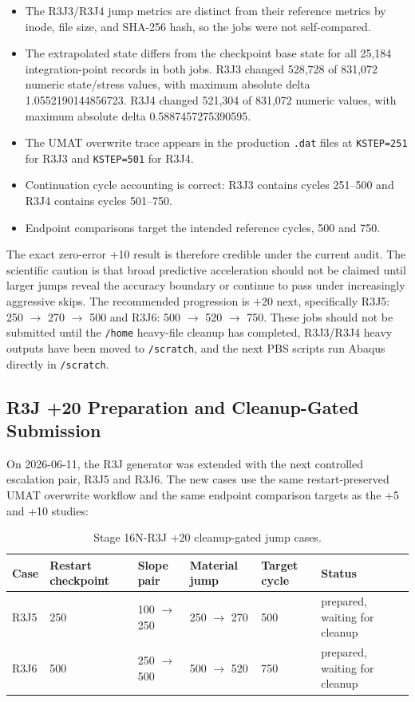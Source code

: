 \documentclass[11pt,a4paper]{article}
\newcommand{\code}[1]{\texttt{#1}}
\begin{document}
\begin{itemize}
  \item The R3J3/R3J4 jump metrics are distinct from their reference metrics by inode, file size, and SHA-256 hash, so the jobs were not self-compared.
  \item The extrapolated state differs from the checkpoint base state for all 25,184 integration-point records in both jobs. R3J3 changed 528,728 of 831,072 numeric state/stress values, with maximum absolute delta 1.0552190144856723. R3J4 changed 521,304 of 831,072 numeric values, with maximum absolute delta 0.5887457275390595.
  \item The UMAT overwrite trace appears in the production \code{.dat} files at \code{KSTEP=251} for R3J3 and \code{KSTEP=501} for R3J4.
  \item Continuation cycle accounting is correct: R3J3 contains cycles 251--500 and R3J4 contains cycles 501--750.
  \item Endpoint comparisons target the intended reference cycles, 500 and 750.
\end{itemize}

The exact zero-error +10 result is therefore credible under the current audit. The scientific caution is that broad predictive acceleration should not be claimed until larger jumps reveal the accuracy boundary or continue to pass under increasingly aggressive skips. The recommended progression is +20 next, specifically R3J5: 250 $\rightarrow$ 270 $\rightarrow$ 500 and R3J6: 500 $\rightarrow$ 520 $\rightarrow$ 750. These jobs should not be submitted until the \code{/home} heavy-file cleanup has completed, R3J3/R3J4 heavy outputs have been moved to \code{/scratch}, and the next PBS scripts run Abaqus directly in \code{/scratch}.

\subsection{R3J +20 Preparation and Cleanup-Gated Submission}

On 2026-06-11, the R3J generator was extended with the next controlled escalation pair, R3J5 and R3J6. The new cases use the same restart-preserved UMAT overwrite workflow and the same endpoint comparison targets as the +5 and +10 studies:

\begin{table}[H]
\centering
\caption{Stage 16N-R3J +20 cleanup-gated jump cases.}
\begin{tabular}{llllll}
\toprule
Case & Restart checkpoint & Slope pair & Material jump & Target cycle & Status \\
\midrule
R3J5 & 250 & 100 $\rightarrow$ 250 & 250 $\rightarrow$ 270 & 500 & prepared, waiting for cleanup \\
R3J6 & 500 & 250 $\rightarrow$ 500 & 500 $\rightarrow$ 520 & 750 & prepared, waiting for cleanup \\
\bottomrule
\end{tabular}
\end{table}
\end{document}
